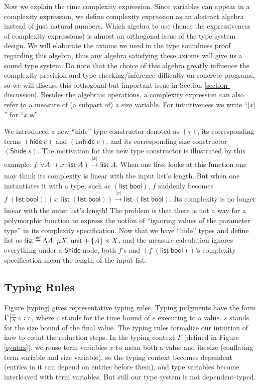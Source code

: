 \documentclass[preprint]{sigplanconf}
\newcommand{\thide}[1]{\left \{ #1 \right \}}
\newcommand{\typing}[4]{\sststile{#4}{#3}#1:#2}
\newcommand{\arrow}[4]{#1\xrightarrow[#3]{#2}#4}
\newcommand{\symhide}{\mathsf{hide\;}}
\newcommand{\symShide}{\mathsf{Shide}}
\newcommand{\symunhide}{\mathsf{unhide\;}}
\newcommand{\symunit}{\mathsf{unit}}
\newcommand{\symlist}{\mathsf{list}}
\newcommand{\symbool}{\mathsf{bool}}
\newcommand{\intro}[2]{(#1 : #2)}
\newcommand{\symwork}{\mathsf{w}}
\newcommand\defeq{\mathrel{\overset{\makebox[0pt]{\mbox{\normalfont\tiny\sffamily def}}}{=}}}
\begin{document}
Now we explain the time complexity expression. Since variables can appear in a complexity expression, we define complexity expression as an abstract algebra instead of just natural numbers. Which algebra to use (hence the expressiveness of complexity expressions) is almost an orthogonal issue of the type system design. We will elaborate the axioms we used in the type soundness proof regarding this algebra, thus any algebra satisfying these axioms will give us a sound type system. Do note that the choice of this algebra greatly influence the complexity precision and type checking/inference difficulty on concrete programs, so we will discuss this orthogonal but important issue in Section \ref{section-discussion}. Besides the algebraic operations, a complexity expression can also refer to a measure of (a subpart of) a size variable. For intuitiveness we write ``$|x|$'' for ``$x.\symwork$''

We introduced a new ``hide'' type constructor denoted as $\thide{\tau}$, its corresponding terms $(\symhide e)$ and $(\symunhide e)$, and its corresponding size constructor $(\symShide\;s)$. The motivation for this new type constructor is illustrated by this example: $f:\forall A.\;\arrow{\intro{x}{\symlist\;A}}{|x|}{}{\symlist\;A}$. When one first looks at this function one may think its complexity is linear with the input list's length. But when one instantiates it with a type, such as $(\symlist\;\symbool)$, $f$ suddenly becomes $f\;(\symlist\;\symbool):\arrow{\intro{x}{\symlist\;(\symlist\;\symbool)}}{|x|}{}{\symlist\;(\symlist\;\symbool)}$. Its complexity is no longer linear with the outer list's length! The problem is that there is not a way for a polymorphic function to express the notion of ``ignoring values of the parameter type'' in its complexity specification. Now that we have ``hide'' types and define list as $\symlist \defeq \Lambda A.\;\mu X.\;\symunit + \thide{A} \times X$, and the measure calculation ignores everything under a $\symShide$ node, both $f$'s and $(f\;(\symlist\;\symbool))$'s complexity specification mean the length of the input list.

\subsection{Typing Rules}

Figure \ref{typing} gives representative typing rules. Typing judgments have the form $\Gamma\typing{e}{\tau}{c}{s}$, where $c$ stands for the time bound of $e$ executing to a value. $s$ stands for the size bound of the final value. The typing rules formalize our intuition of how to count the reduction steps. In the typing context $\Gamma$ (defined in Figure \ref{syntax}), we reuse term variables $x$ to mean both a value and its size (conflating term variable and size variable), so the typing context becomes dependent (entries in it can depend on entries before them), and type variables become interleaved with term variables. But still our type system is not dependent-typed.
\end{document}
